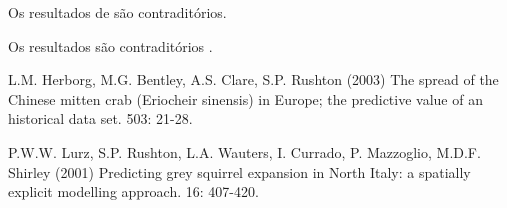
Os resultados de \cite{highlander:2003} são contraditórios.



Os resultados são contraditórios \citep{highlander:2003}.




\begin{footnotesize}
\begin{thebibliography}{99}



 
L.M. Herborg, M.G. Bentley, A.S. Clare, S.P. Rushton (2003)
\newblock The spread of the Chinese mitten crab (Eriocheir sinensis) in
Europe; the predictive value of an historical data set.
 503: 21-28.

 P.W.W. Lurz, S.P. Rushton, L.A. Wauters, I. Currado,
P. Mazzoglio, M.D.F. Shirley (2001)
\newblock Predicting grey squirrel expansion in North Italy: a spatially
explicit modelling approach.
 16: 407-420.



\end{thebibliography}
\end{footnotesize}



